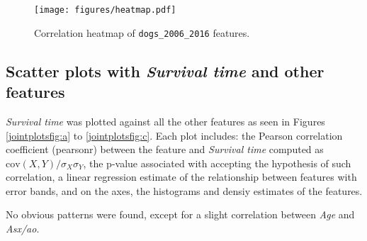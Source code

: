 \documentclass[12pt]{report}
\begin{document}
\begin{figure}[h]
  \centering
  	\texttt{[image: figures/heatmap.pdf]}
  \caption{Correlation heatmap of \texttt{dogs\_2006\_2016} features.}
  \label{corrheatmap}
\end{figure}

\subsection*{Scatter plots with \textit{Survival time} and other features}
\textit{Survival time} was plotted against all the other features as seen in Figures \ref{jointplotsfig:a} to \ref{jointplotsfig:c}. Each plot includes: the Pearson correlation coefficient (pearsonr) between the feature and \textit{Survival time} computed as $\text{cov}(X,Y) / \sigma_{X}\sigma_{Y}$, the p-value associated with accepting the hypothesis of such correlation, a linear regression estimate of the relationship between features with error bands, and on the axes, the histograms and densiy estimates of the features.

No obvious patterns were found, except for a slight correlation between \textit{Age} and \textit{Asx/ao}.
\end{document}
